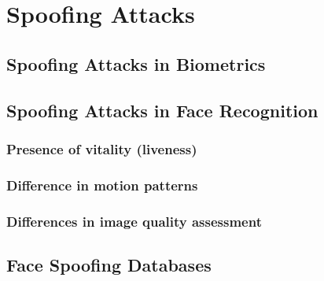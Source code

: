 \chapter{Spoofing Attacks}
\label{chap:Spoofing}

\section{Spoofing Attacks in Biometrics}
\label{sec:SpoofingAttacksBiometrics}

\section{Spoofing Attacks in Face Recognition}
\label{sec:SpoofingAttacksFaceRec}

\subsection{Presence of vitality (liveness)}
\subsection{Difference in motion patterns}
\subsection{Differences in image quality assessment}


\section{Face Spoofing Databases}
\label{sec:Databases}
